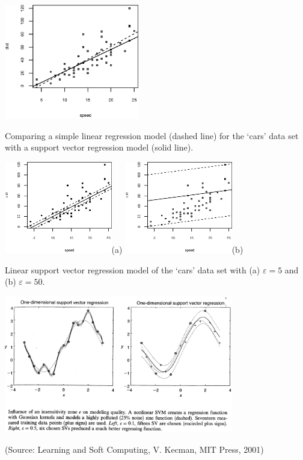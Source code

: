 \documentclass[a4paper,blends,pdf,colorBG,slideColor]{prosper}
\begin{document}
\es

\vspace{.2in}
\begin{center}
\includegraphics[height=50mm]{figures/fig12-05.eps}
\end{center}
Comparing a simple linear regression model (dashed line) for the `cars' data set with a support vector
regression model (solid line).
\es

\vspace{.2in}
\begin{center}
\includegraphics[height=40mm]{figures/fig12-06.eps}(a)
\includegraphics[height=40mm]{figures/fig12-07.eps}(b)
\end{center}
Linear support vector regression model of the `cars' data set with (a) $\varepsilon = 5$ and (b) $\varepsilon = 50$.
\es

{\small
\begin{center}
\includegraphics[height=60mm]{figures/nonlinear-regression.eps}
\end{center}

(Source: Learning and Soft Computing, V. Kecman, MIT Press, 2001)
}
\es
\end{document}

